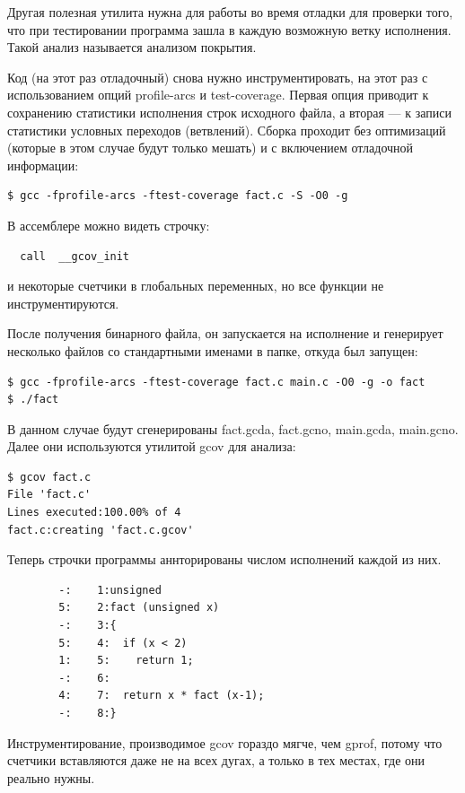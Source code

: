 \documentclass[a4paper,12pt,oneside]{article}
\begin{document}
Другая полезная утилита нужна для работы во время отладки для проверки того, что при тестировании программа зашла в каждую возможную ветку исполнения. Такой анализ называется анализом покрытия.

Код (на этот раз отладочный) снова нужно инструментировать, на этот раз с использованием опций profile-arcs и test-coverage. Первая опция приводит к сохранению статистики исполнения строк исходного файла, а вторая — к записи статистики условных переходов (ветвлений). Сборка проходит без оптимизаций (которые в этом случае будут только мешать) и с включением отладочной информации:

\begin{verbatim}
$ gcc -fprofile-arcs -ftest-coverage fact.c -S -O0 -g
\end{verbatim}

В ассемблере можно видеть строчку:

\begin{verbatim}
  call  __gcov_init
\end{verbatim}

и некоторые счетчики в глобальных переменных, но все функции не инструментируются.

После получения бинарного файла, он запускается на исполнение и генерирует несколько файлов со стандартными именами в папке, откуда был запущен:

\begin{verbatim}
$ gcc -fprofile-arcs -ftest-coverage fact.c main.c -O0 -g -o fact
$ ./fact
\end{verbatim}
    
В данном случае будут сгенерированы fact.gcda, fact.gcno, main.gcda, main.gcno. Далее они используются утилитой gcov для анализа:

\begin{verbatim}
$ gcov fact.c
File 'fact.c'
Lines executed:100.00% of 4
fact.c:creating 'fact.c.gcov'
\end{verbatim}

Теперь строчки программы аннторированы числом исполнений каждой из них.

\begin{verbatim}
        -:    1:unsigned
        5:    2:fact (unsigned x)
        -:    3:{
        5:    4:  if (x < 2)
        1:    5:    return 1;
        -:    6:
        4:    7:  return x * fact (x-1);
        -:    8:}
\end{verbatim}

Инструментирование, производимое gcov гораздо мягче, чем gprof, потому что счетчики вставляются даже не на всех дугах, а только в тех местах, где они реально нужны.
\end{document}

